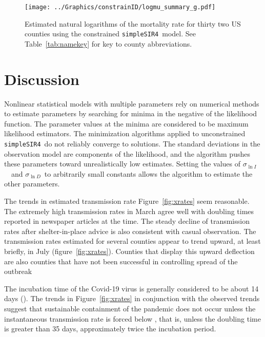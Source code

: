\documentclass[12pt,letterpaper]{article}
\newcommand\help[1]{\color{Magenta}{\it #1 }\normalcolor}
\newcommand\SSm{{\tt simpleSIR4}}
\newcommand\slI{$\sigma_{\ln I}$\ }
\newcommand\slD{$\sigma_{\ln D}$}
\begin{document}
\begin{figure}
\begin{center}
\texttt{[image: ../Graphics/constrainID/logmu\_summary\_g.pdf]}\\
\end{center}
\caption{\label{fig:drates}
Estimated natural logarithms of the mortality rate for thirty two US
counties using the constrained \SSm\ model.
See Table~\ref{tab:namekey} for key to county abbreviations.
}
\end{figure}

\section*{Discussion}

Nonlinear statistical models with multiple parameters rely
on numerical methods to estimate parameters by searching for minima
in the negative of the likelihood
function. The parameter values at the minima are considered to be
maximum likelihood estimators.  The minimization algorithms applied to
unconstrained \SSm\ do not reliably converge to solutions. The
standard deviations in the observation model are components of the
likelihood, and the algorithm pushes these parameters toward
unrealistically low estimates.  Setting the values of
\slI\ and \slD\ to arbitrarily small constants allows the
algorithm to estimate the other parameters.

The trends in estimated transmission rate Figure~\ref{fig:xrates} seem
reasonable. The extremely high transmission rates in March agree well
with doubling times reported in newspaper articles at the time.
The steady decline of transmission rates after shelter-in-place advice is 
also consistent with casual observation.
The transmission rates estimated for several counties appear to trend
upward, at least briefly, in July (figure~\ref{fig:xrates}). Counties
that display this upward deflection are also counties that have not
been successful in controlling spread of the outbreak

The incubation time of the Covid-19 virus is generally considered to be
about 14 days (\cite{Someone2020}).
The trends in Figure~\ref{fig:xrates} in conjunction with the
observed trends suggest that sustainable containment of
the pandemic does not occur unless the instantaneous transmission rate
is forced below \help{ $0.018 da^{-1}$}, that is, unless the doubling
time is greater than 35 days, approximately twice the incubation
period.
\end{document}

